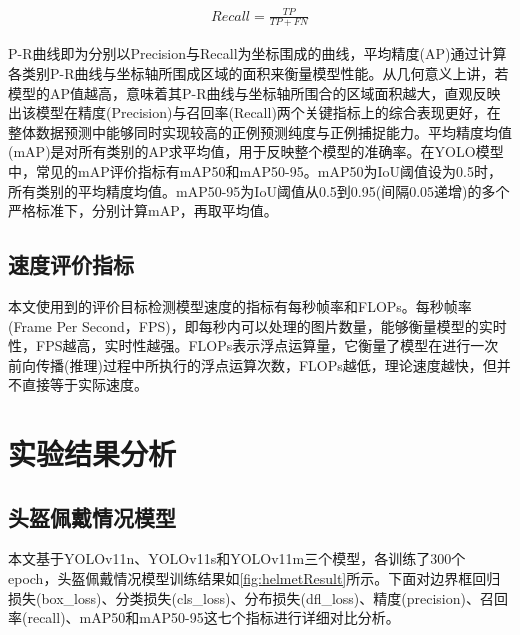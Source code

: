 \begin{equation}
    \begin{aligned}
    Recall = \frac{TP}{TP + FN}\label{eq:recall}
    \end{aligned}
\end{equation}

P-R曲线即为分别以Precision与Recall为坐标围成的曲线，平均精度(AP)通过计算各类别P-R曲线与坐标轴所围成区域的面积来衡量模型性能。从几何意义上讲，若模型的AP值越高，意味着其P-R曲线与坐标轴所围合的区域面积越大，直观反映出该模型在精度(Precision)与召回率(Recall)两个关键指标上的综合表现更好，在整体数据预测中能够同时实现较高的正例预测纯度与正例捕捉能力。平均精度均值(mAP)是对所有类别的AP求平均值，用于反映整个模型的准确率。在YOLO模型中，常见的mAP评价指标有mAP50和mAP50-95。mAP50为IoU阈值设为0.5时，所有类别的平均精度均值。mAP50-95为IoU阈值从0.5到0.95(间隔0.05递增)的多个严格标准下，分别计算mAP，再取平均值。


\subsection{速度评价指标}
本文使用到的评价目标检测模型速度的指标有每秒帧率和FLOPs。每秒帧率(Frame Per Second，FPS)，即每秒内可以处理的图片数量，能够衡量模型的实时性，FPS越高，实时性越强。FLOPs表示浮点运算量，它衡量了模型在进行一次前向传播(推理)过程中所执行的浮点运算次数，FLOPs越低，理论速度越快，但并不直接等于实际速度。

\section{实验结果分析}
\subsection{头盔佩戴情况模型}
本文基于YOLOv11n、YOLOv11s和YOLOv11m三个模型，各训练了300个epoch，头盔佩戴情况模型训练结果如\ref{fig:helmetResult}所示。下面对边界框回归损失(box\_loss)、分类损失(cls\_loss)、分布损失(dfl\_loss)、精度(precision)、召回率(recall)、mAP50和mAP50-95这七个指标进行详细对比分析。

